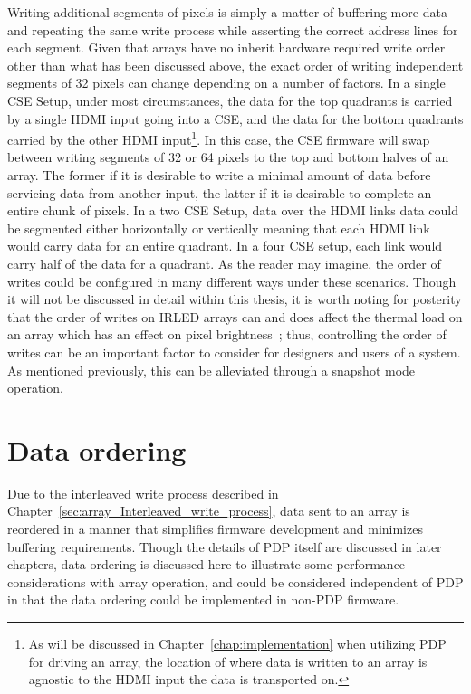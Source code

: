     Writing additional segments of pixels is simply a matter of buffering more data and repeating the same write process while asserting the correct address lines for each segment. Given that arrays have no inherit hardware required write order other than what has been discussed above, the exact order of writing independent segments of 32 pixels can change depending on a number of factors. In a single CSE Setup, under most circumstances, the data for the top quadrants is carried by a single HDMI input going into a CSE, and the data for the bottom quadrants carried by the other HDMI input\footnote{As will be discussed in Chapter~\ref{chap:implementation} when utilizing PDP for driving an array, the location of where data is written to an array is agnostic to the HDMI input the data is transported on.}. In this case, the CSE firmware will swap between writing segments of 32 or 64 pixels to the top and bottom halves of an array. The former if it is desirable to write a minimal amount of data before servicing data from another input, the latter if it is desirable to complete an entire chunk of pixels. In a two CSE Setup, data over the HDMI links data could be segmented either horizontally or vertically meaning that each HDMI link would carry data for an entire quadrant. In a four CSE setup, each link would carry half of the data for a quadrant. As the reader may imagine, the order of writes could be configured in many different ways under these scenarios. Though it will not be discussed in detail within this thesis, it is worth noting for posterity that the order of writes on IRLED arrays can and does affect the thermal load on an array which has an effect on pixel brightness~\cite{BarakhshanEtAl2017, LaVeigneSieglinger2012, Norton2013}; thus, controlling the order of writes can be an important factor to consider for designers and users of a system. As mentioned previously, this can be alleviated through a snapshot mode operation.

\section{Data ordering}
    Due to the interleaved write process described in Chapter~\ref{sec:array_Interleaved_write_process}, data sent to an array is reordered in a manner that simplifies firmware development and minimizes buffering requirements. Though the details of PDP itself are discussed in later chapters, data ordering is discussed here to illustrate some performance considerations with array operation, and could be considered independent of PDP in that the data ordering could be implemented in non-PDP firmware.

